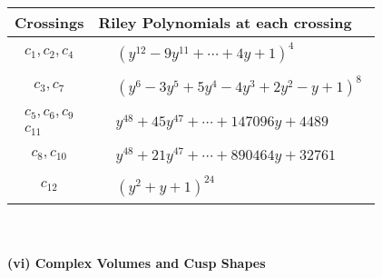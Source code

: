 \documentclass[1p]{elsarticle_modified}
\theoremstyle{definition}
\begin{document}
\begin{tabular}{m{50pt}|m{274pt}}
Crossings & \hspace{64pt}Riley Polynomials at each crossing \\
\hline $$\begin{aligned}c_{1},c_{2},c_{4}\end{aligned}$$&$\begin{aligned}
&(y^{12}-9 y^{11}+\cdots+4 y+1)^{4}
\end{aligned}$\\
\hline $$\begin{aligned}c_{3},c_{7}\end{aligned}$$&$\begin{aligned}
&(y^6-3 y^5+5 y^4-4 y^3+2 y^2- y+1)^8
\end{aligned}$\\
\hline $$\begin{aligned}c_{5},c_{6},c_{9}\\c_{11}\end{aligned}$$&$\begin{aligned}
&y^{48}+45 y^{47}+\cdots+147096 y+4489
\end{aligned}$\\
\hline $$\begin{aligned}c_{8},c_{10}\end{aligned}$$&$\begin{aligned}
&y^{48}+21 y^{47}+\cdots+890464 y+32761
\end{aligned}$\\
\hline $$\begin{aligned}c_{12}\end{aligned}$$&$\begin{aligned}
&(y^2+y+1)^{24}
\end{aligned}$\\
\hline
\end{tabular}\\~\\
\newpage\flushleft \textbf{(vi) Complex Volumes and Cusp Shapes}
\end{document}
